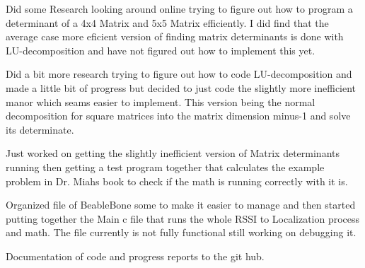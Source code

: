 \documentclass[fontsize=11pt, %
                             paper=letter, %
                             twoside, %
                             captions=tableheading,
                             index=totoc,
                             hyperref]{labbook}
\begin{document}
\begin{addmargin}[0cm]{0cm}
Did some Research looking around online trying to figure out how to program a determinant of a 4x4 Matrix and 5x5 Matrix efficiently.  I did find that the average case more eficient version of finding matrix determinants is done with LU-decomposition and have not figured out how to implement this yet.

Did a bit more research trying to figure out how to code LU-decomposition and made a little bit of progress but decided to just code the slightly more inefficient manor which seams easier to implement.  This version being the normal decomposition for square matrices into the matrix dimension minus-1 and solve its determinate.

Just worked on getting the slightly inefficient version of Matrix determinants running then getting a test program together that calculates the example problem in Dr. Miahs book to check if the math is running correctly with it is.

Organized file of BeableBone some to make it easier to manage and then started putting together the Main c file that runs the whole RSSI to Localization process and math.  The file currently is not fully functional still working on debugging it.

Documentation of code and progress reports to the git hub.

\end{addmargin}


%
%
%
%
%

\end{document}
